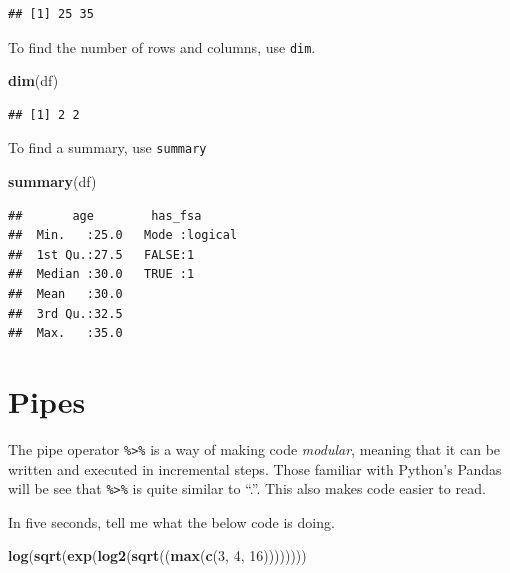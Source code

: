 \documentclass[openany]{book}
\newenvironment{Shaded}{\begin{snugshade}}{\end{snugshade}}
\newcommand{\DecValTok}[1]{\textcolor[rgb]{0.00,0.00,0.81}{#1}}
\newcommand{\KeywordTok}[1]{\textcolor[rgb]{0.13,0.29,0.53}{\textbf{#1}}}
\newcommand{\NormalTok}[1]{#1}
\begin{document}
\begin{verbatim}
## [1] 25 35
\end{verbatim}

To find the number of rows and columns, use \texttt{dim}.

\begin{Shaded}
\begin{Highlighting}[]
\KeywordTok{dim}\NormalTok{(df)}
\end{Highlighting}
\end{Shaded}

\begin{verbatim}
## [1] 2 2
\end{verbatim}

To find a summary, use \texttt{summary}

\begin{Shaded}
\begin{Highlighting}[]
\KeywordTok{summary}\NormalTok{(df)}
\end{Highlighting}
\end{Shaded}

\begin{verbatim}
##       age        has_fsa       
##  Min.   :25.0   Mode :logical  
##  1st Qu.:27.5   FALSE:1        
##  Median :30.0   TRUE :1        
##  Mean   :30.0                  
##  3rd Qu.:32.5                  
##  Max.   :35.0
\end{verbatim}

\hypertarget{pipes}{%
\section{Pipes}\label{pipes}}

The pipe operator \texttt{\%\textgreater{}\%} is a way of making code \emph{modular}, meaning that it can
be written and executed in incremental steps. Those familiar with Python's Pandas
will be see that \texttt{\%\textgreater{}\%} is quite similar to ``.''. This also makes code easier to
read.

In five seconds, tell me what the below code is doing.

\begin{Shaded}
\begin{Highlighting}[]
\KeywordTok{log}\NormalTok{(}\KeywordTok{sqrt}\NormalTok{(}\KeywordTok{exp}\NormalTok{(}\KeywordTok{log2}\NormalTok{(}\KeywordTok{sqrt}\NormalTok{((}\KeywordTok{max}\NormalTok{(}\KeywordTok{c}\NormalTok{(}\DecValTok{3}\NormalTok{, }\DecValTok{4}\NormalTok{, }\DecValTok{16}\NormalTok{))))))))}
\end{Highlighting}
\end{Shaded}
\end{document}
